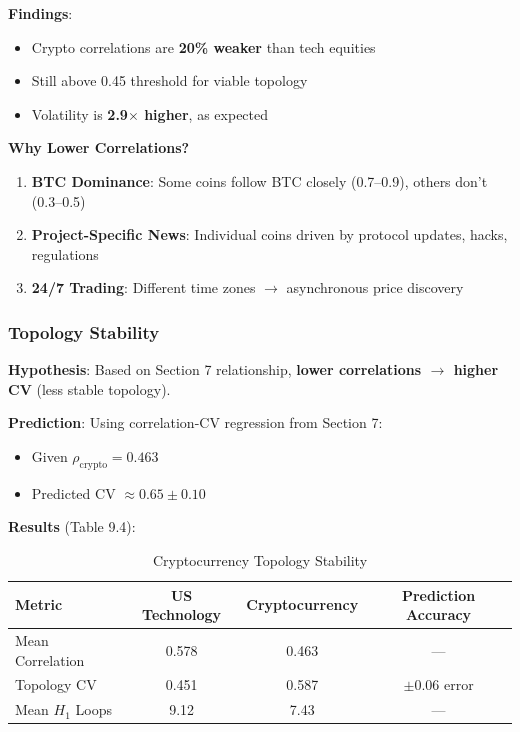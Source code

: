 \textbf{Findings}:
\begin{itemize}
\item Crypto correlations are \textbf{20\% weaker} than tech equities
\item Still above 0.45 threshold for viable topology
\item Volatility is \textbf{2.9$\times$ higher}, as expected
\end{itemize}

\textbf{Why Lower Correlations?}
\begin{enumerate}
\item \textbf{BTC Dominance}: Some coins follow BTC closely (0.7--0.9), others don't (0.3--0.5)
\item \textbf{Project-Specific News}: Individual coins driven by protocol updates, hacks, regulations
\item \textbf{24/7 Trading}: Different time zones $\rightarrow$ asynchronous price discovery
\end{enumerate}

\subsubsection{Topology Stability}

\textbf{Hypothesis}: Based on Section 7 relationship, \textbf{lower correlations $\rightarrow$ higher CV} (less stable topology).

\textbf{Prediction}: Using correlation-CV regression from Section 7:
\begin{itemize}
\item Given $\rho_{\text{crypto}} = 0.463$
\item Predicted CV $\approx 0.65 \pm 0.10$
\end{itemize}

\textbf{Results} (Table 9.4):

\begin{table}[H]
\centering
\caption{Cryptocurrency Topology Stability}
\label{tab:crypto-topology}
\begin{tabular}{@{}lccc@{}}
\toprule
\textbf{Metric} & \textbf{US Technology} & \textbf{Cryptocurrency} & \textbf{Prediction Accuracy} \\
\midrule
Mean Correlation & 0.578 & 0.463 & --- \\
Topology CV & 0.451 & 0.587 & $\pm$0.06 error \\
Mean $H_1$ Loops & 9.12 & 7.43 & --- \\
\bottomrule
\end{tabular}
\end{table}

